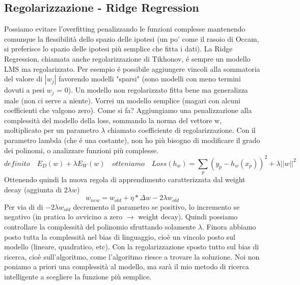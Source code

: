 \documentclass{article}
\begin{document}
\subsection{Regolarizzazione - Ridge Regression}
Possiamo evitare l'overfitting penalizzando le funzioni complesse mantenendo comunque la flessibilità dello spazio delle ipotesi (un po' come il rasoio di Occam, si preferisce lo spazio delle ipotesi più semplice che fitta i dati). \newline
La Ridge Regression, chiamata anche regolarizzazione di Tikhonov, é sempre un modello LMS ma regolarizzato. Per esempio é possibile aggiungere vincoli alla sommatoria del valore di $|w_j|$ favorendo modelli "sparsi" (sono modelli con meno termini dovuti a pesi $w_j$ = 0). \newline 
Un modello non regolarizzato fitta bene ma generalizza male (non ci serve a niente). Vorrei un modello semplice (magari con alcuni coefficienti che valgono zero). Come si fa? Aggiungiamo una penalizzazione alla complessità del modello della loss, sommando la norma del vettore w, moltiplicato per un parametro $\lambda$ chiamato coefficiente di regolarizzazione. Con il parametro lambda (che é una costante), non ho più bisogno di modificare il grado dei polinomi, o analizzare funzioni più complesse.
\begin{equation}
    definito \quad E_D(w)+\lambda E_W(w) \quad otteniamo \quad Loss(h_w)=\sum_{p} (y_p-h_w(x_p))^2+\lambda ||w||^2
\end{equation}
Ottenendo quindi la nuova regola di apprendimento caratterizzata dal weight decay (aggiunta di $2\lambda w$)
\begin{equation}
    w_{new}= w_{old} + \eta*\Delta w - 2 \lambda w_{old}
\end{equation}
Per via di di $-2\lambda w_{old}$ decremento il parametro se positivo, lo incremento se negativo (in pratica lo avvicino a zero $\rightarrow$ weight decay). Quindi possiamo controllare la complessità del polinomio sfruttando solamente $\lambda$.\newline
Finora abbiamo posto tutta la complessità nel bias di linguaggio, cioè un vincolo posto sul modello (lineare, quadratico, etc). Con la regolarizzazione sposto tutto sul bias di ricerca, cioè sull'algoritmo, come l'algoritmo riesce a trovare la soluzione. Noi non poniamo a priori una complessità al modello, ma sarà il mio metodo di ricerca intelligente a scegliere la funzione più semplice.
\end{document}
